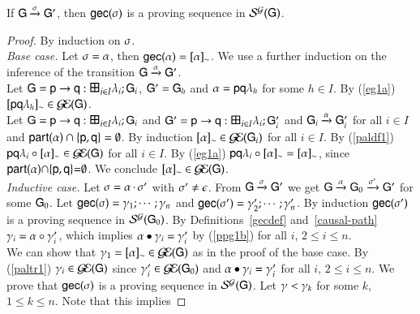   
\begin{theorem}
 If %
${\sf G}\xrightarrow{\sigma} {\sf G}'$,
then
 ${\sf gec}(\sigma)$ is a proving sequence in $ \mathcal{S}^{\mathcal{G}}( {\sf G})$. 
\end{theorem}
\begin{proof}
By induction on ${\sigma}$.\\
 \emph{Base case.} 
Let $\sigma=\alpha$,  then ${\sf gec}(\alpha)=[\alpha]_{\sim}$.   We use a further induction on 
the inference of the transition  $ {\sf G}\xrightarrow{\alpha} {\sf G}'$.\\
 Let $ \G=\gt\pp\q i I \la \G$, ${\sf G}'= {\sf G}_h$  and $\alpha={\sf p}{\sf q}\lambda_h$ for some $h\in I$. By (\ref{eg1a}) $[{\sf p}{\sf q}\lambda_h]_{\sim}\in \mathcal{G\!E}( {\sf G})$.\\
Let $\G= \gt\pp\q i I \la \G$ and $\G'= \gt\pp\q i I \la {\G'}$ and $ {\sf G}_i\xrightarrow{\alpha}{\sf G}_i'$  for all $ i \in I$ and ${\sf part}(\alpha)\cap\{{\sf p},{\sf q}\}=\emptyset$. By induction $[\alpha]_{\sim}\in\mathcal{G\!E}( {\sf G}_i)$ for all $ i \in I$. 
By (\ref{paldf1}) ${{\sf p}{\sf q}\lambda_i}\circ{\ensuremath{[\alpha]_{\sim}}}\in\mathcal{G\!E}({\sf G})$ for all $ i \in I$.
By (\ref{eg1a}) ${{\sf p}{\sf q}\lambda_i}\circ{\ensuremath{[\alpha]_{\sim}}}=[\alpha]_{\sim}$, since ${\sf part}(\alpha){\cap}\{{\sf p},{\sf q}\}{=}\emptyset$. We conclude $[\alpha]_{\sim}\in\mathcal{G\!E}({\sf G})$. \\
\emph{Inductive case.}   Let
$\sigma=\alpha\,{\cdot}\,\sigma'$ with $\sigma'\not=\epsilon$.  %
  From
 ${\sf G}\xrightarrow{\sigma}{\sf G}'$ we get    ${\sf G}\xrightarrow{\alpha}{\sf G}_0\xrightarrow{\sigma'}{\sf G}'$ for some ${\sf G}_0$.  Let ${\sf gec}(\sigma)=\gamma_1;\cdots;\gamma_{n}$ and ${\sf gec}(\sigma')=\gamma'_2;\cdots;\gamma'_{n}$.
  By induction 
    ${\sf gec}(\sigma')$  is a proving
    sequence in $\mathcal{S}^{\mathcal{G}}({\sf G}_0)$. 
   By Definitions~\ref{gecdef} and~\ref{causal-path}  $\gamma_i={\alpha}\circ{\ensuremath{\gamma}'_i}$, which implies 
    ${\alpha}\bullet{\ensuremath{\gamma}_i}=\gamma'_i$ by (\ref{ppg1b}) for  all $i$,  $2\leq i\leq n$.\\
    We can show that $\gamma_1=[\alpha]_{\sim}\in\mathcal{G\!E}({\sf G})$ as in the proof of the base case. By (\ref{paltr1}) $\gamma_i\in\mathcal{G\!E}({\sf G})$ since $\gamma_i'\in\mathcal{G\!E}({\sf G}_0)$ and 
    ${\alpha}\bullet{\ensuremath{\gamma}_i}=\gamma'_i$ for  all $i$,  $2\leq i\leq n$.
We  prove that   ${\sf gec}(\sigma)$  is a
proving sequence in  $\mathcal{S}^{\mathcal{G}}({\sf G})$. 
Let
$\gamma<  \gamma_k$ for some $k$, $1\leq k\leq n$.  Note that this implies 

\end{proof}
